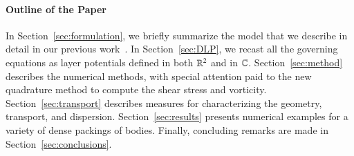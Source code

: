 \documentclass[preprint, 10pt]{elsarticle}
\begin{document}
\paragraph{Outline of the Paper}
In Section~\ref{sec:formulation}, we briefly summarize the model that we
describe in detail in our previous work~\cite{qua-moo2018}.  In
Section~\ref{sec:DLP}, we recast all the governing equations as layer
potentials defined in both ${\mathbb{R}}^2$ and in ${\mathbb{C}}$.
Section~\ref{sec:method} describes the numerical methods, with special
attention paid to the new quadrature method to compute the shear stress
and vorticity.  Section~\ref{sec:transport} describes measures for
characterizing the geometry, transport, and dispersion.
Section~\ref{sec:results} presents numerical examples for a variety of
dense packings of bodies.  Finally, concluding remarks are made in
Section~\ref{sec:conclusions}.

\end{document}
